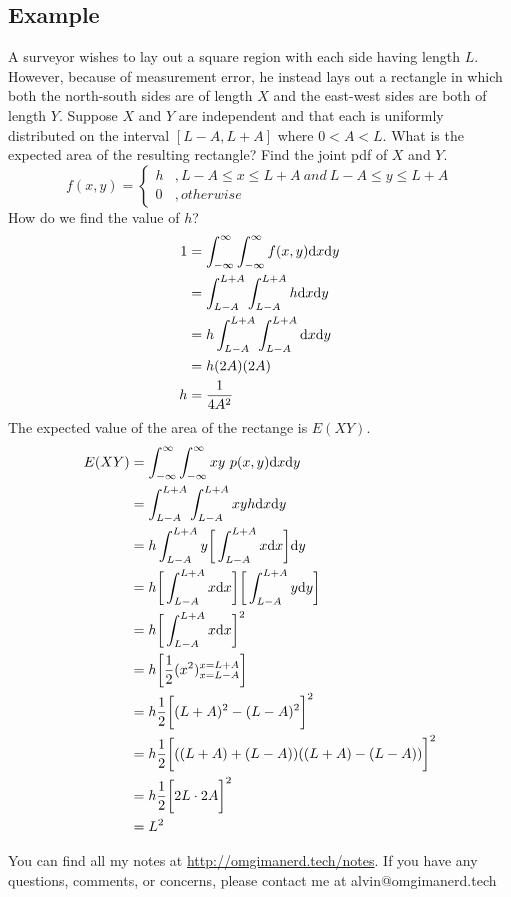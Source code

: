 \documentclass{math}
\begin{document}
\subsection*{Example}
A surveyor wishes to lay out a square region with each side having length
\( L \). However, because of measurement error, he instead lays out a
rectangle in which both the north-south sides are of length \( X \) and
the east-west sides are both of length \( Y \). Suppose \( X \) and \( Y \)
are independent and that each is uniformly distributed on the interval
\( [L-A,L+A] \) where \( 0<A<L \). What is the expected area of the
resulting rectangle? Find the joint pdf of \( X \) and \( Y \).
\[ f(x,y) = \begin{cases}
  h &, L-A\leq x\leq L+A\ and\ L-A\leq y\leq L+A \\
  0 &, otherwise
\end{cases} \]
How do we find the value of \( h \)?
\begin{align*}
  1 &= \int_{-\infty}^{\infty}\int_{-\infty}^{\infty}f(x,y)\mathrm{d}{x}\mathrm{d}{y} \\
  &= \int_{L-A}^{L+A}\int_{L-A}^{L+A}h\mathrm{d}{x}\mathrm{d}{y} \\
  &= h\int_{L-A}^{L+A}\int_{L-A}^{L+A}\mathrm{d}{x}\mathrm{d}{y} \\
  &= h(2A)(2A) \\
  h &= \frac{1}{4A^{2}}
\end{align*}
The expected value of the area of the rectange is \( E(XY) \).
\begin{align*}
  E(XY) &= \int_{-\infty}^{\infty}\int_{-\infty}^{\infty}
    xy\ p(x,y)\mathrm{d}{x}\mathrm{d}{y} \\
  &= \int_{L-A}^{L+A}\int_{L-A}^{L+A}xyh\mathrm{d}{x}\mathrm{d}{y} \\
  &= h\int_{L-A}^{L+A}y\bigg[\int_{L-A}^{L+A}x\mathrm{d}{x}\bigg]\mathrm{d}{y} \\
  &= h\bigg[\int_{L-A}^{L+A}x\mathrm{d}{x}\bigg]
    \bigg[\int_{L-A}^{L+A}y\mathrm{d}{y}\bigg] \\
  &= h\bigg[\int_{L-A}^{L+A}x\mathrm{d}{x}\bigg]^{2} \\
  &= h\bigg[\frac{1}{2}(x^{2})_{x=L-A}^{x=L+A}\bigg] \\
  &= h\frac{1}{2}\bigg[(L+A)^{2}-(L-A)^{2}\bigg]^{2} \\
  &= h\frac{1}{2}\bigg[((L+A)+(L-A))((L+A)-(L-A))\bigg]^{2} \\
  &= h\frac{1}{2}\bigg[2L\cdot2A\bigg]^{2} \\
  &= L^{2}
\end{align*}

\begin{center}
  You can find all my notes at \url{http://omgimanerd.tech/notes}. If you have
  any questions, comments, or concerns, please contact me at
  alvin@omgimanerd.tech
\end{center}
\end{document}
